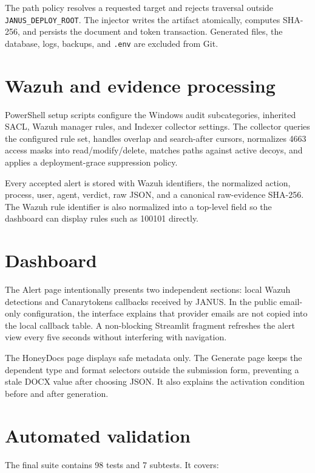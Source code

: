 The path policy resolves a requested target and rejects traversal outside
\texttt{JANUS\_DEPLOY\_ROOT}. The injector writes the artifact atomically,
computes SHA-256, and persists the document and token transaction. Generated
files, the database, logs, backups, and \texttt{.env} are excluded from Git.

\section{Wazuh and evidence processing}

PowerShell setup scripts configure the Windows audit subcategories, inherited
SACL, Wazuh manager rules, and Indexer collector settings. The collector queries
the configured rule set, handles overlap and search-after cursors, normalizes
4663 access masks into read/modify/delete, matches paths against active decoys,
and applies a deployment-grace suppression policy.

Every accepted alert is stored with Wazuh identifiers, the normalized action,
process, user, agent, verdict, raw JSON, and a canonical raw-evidence SHA-256.
The Wazuh rule identifier is also normalized into a top-level field so the
dashboard can display rules such as 100101 directly.

\section{Dashboard}

The Alert page intentionally presents two independent sections: local Wazuh
detections and Canarytokens callbacks received by JANUS. In the public
email-only configuration, the interface explains that provider emails are not
copied into the local callback table. A non-blocking Streamlit fragment refreshes
the alert view every five seconds without interfering with navigation.

The HoneyDocs page displays safe metadata only. The Generate page keeps the
dependent type and format selectors outside the submission form, preventing a
stale DOCX value after choosing JSON. It also explains the activation condition
before and after generation.

\section{Automated validation}

The final suite contains 98 tests and 7 subtests. It covers:


